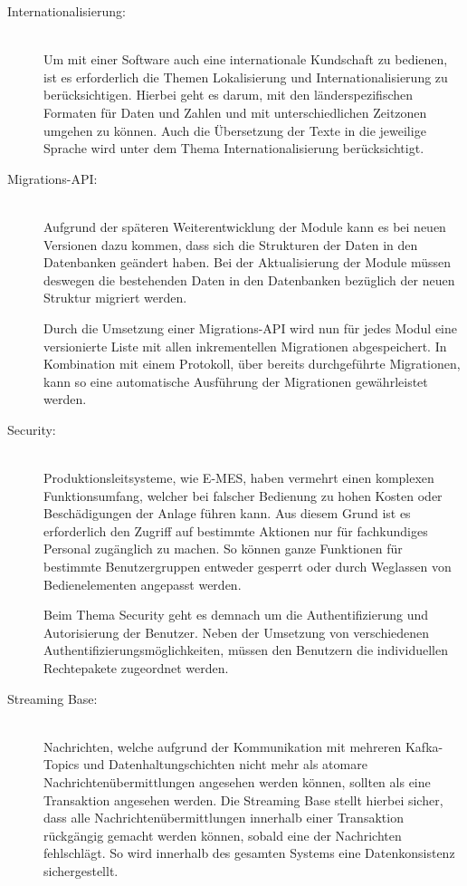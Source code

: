 \begin{description}
    \item[Internationalisierung:]\hfill \\
    Um mit einer Software auch eine internationale Kundschaft zu bedienen, ist es erforderlich die Themen Lokalisierung und Internationalisierung zu berücksichtigen. Hierbei geht es darum, mit den länderspezifischen Formaten für Daten und Zahlen und mit unterschiedlichen Zeitzonen umgehen zu können. Auch die Übersetzung der Texte in die jeweilige Sprache wird unter dem Thema Internationalisierung berücksichtigt.
    
    \item[Migrations-API:]\hfill \\
    Aufgrund der späteren Weiterentwicklung der Module kann es bei neuen Versionen dazu kommen, dass sich die Strukturen der Daten in den Datenbanken geändert haben. Bei der Aktualisierung der Module müssen deswegen die bestehenden Daten in den Datenbanken bezüglich der neuen Struktur migriert werden.

    Durch die Umsetzung einer Migrations-API wird nun für jedes Modul eine versionierte Liste mit allen inkrementellen Migrationen abgespeichert. In Kombination mit einem Protokoll, über bereits durchgeführte Migrationen, kann so eine automatische Ausführung der Migrationen gewährleistet werden.

    \item[Security:]\hfill \\
    Produktionsleitsysteme, wie \glqq E-MES\grqq{}, haben vermehrt einen komplexen Funktionsumfang, welcher bei falscher Bedienung zu hohen Kosten oder Beschädigungen der Anlage führen kann. Aus diesem Grund ist es erforderlich den Zugriff auf bestimmte Aktionen nur für fachkundiges Personal zugänglich zu machen. So können ganze Funktionen für bestimmte Benutzergruppen entweder gesperrt oder durch Weglassen von Bedienelementen angepasst werden.

    Beim Thema \glqq Security\grqq{} geht es demnach um die Authentifizierung und Autorisierung der Benutzer. Neben der Umsetzung von verschiedenen Authentifizierungsmöglichkeiten, müssen den Benutzern die individuellen Rechtepakete zugeordnet werden.

    \item[Streaming Base:]\hfill \\
    Nachrichten, welche aufgrund der Kommunikation mit mehreren Kafka-Topics und Datenhaltungschichten nicht mehr als atomare Nachrichtenübermittlungen angesehen werden können, sollten als eine Transaktion angesehen werden. Die Streaming Base stellt hierbei sicher, dass alle Nachrichtenübermittlungen innerhalb einer Transaktion rückgängig gemacht werden können, sobald eine der Nachrichten fehlschlägt. So wird innerhalb des gesamten Systems eine Datenkonsistenz sichergestellt.


\end{description}
